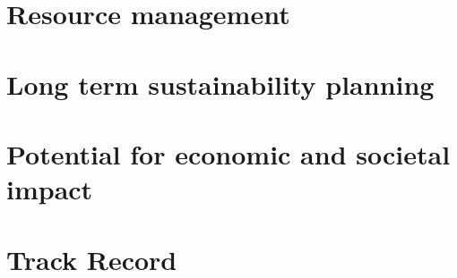 \documentclass[a4paper,11point]{article}
\begin{document}
\section{Resource management}

\section{Long term sustainability planning}

\section{Potential for economic and societal impact}

\section{Track Record}



\end{document}
